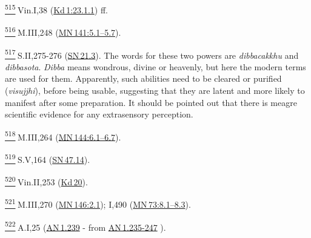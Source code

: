 \label{footprints_split_025.html_fn515}
\hyperref[footprints_split_014.htmlux5cux23fnref515]{\textsuperscript{515}} Vin.I,38
(\href{https://suttacentral.net/pli-tv-kd1/en/brahmali\#23.1.1}{Kd\,1:23.1.1})
ff.

\label{footprints_split_025.html_fn516}
\hyperref[footprints_split_014.htmlux5cux23fnref516]{\textsuperscript{516}} M.III,248
(\href{https://suttacentral.net/mn141/en/sujato\#5.1}{MN\,141:5.1--5.7}).

\label{footprints_split_025.html_fn517}
\hyperref[footprints_split_014.htmlux5cux23fnref517]{\textsuperscript{517}} S.II,275-276
(\href{https://suttacentral.net/sn21.3/en/sujato}{SN\,21.3}). The words
for these two powers are \emph{dibbacakkhu} and \emph{dibbasota}.
\emph{Dibba} means wondrous, divine or heavenly, but here the modern
terms are used for them. Apparently, such abilities need to be cleared
or purified (\emph{visujjhi}), before being usable, suggesting that they
are latent and more likely to manifest after some preparation. It should
be pointed out that there is meagre scientific evidence for any
extrasensory perception.

\label{footprints_split_025.html_fn518}
\hyperref[footprints_split_014.htmlux5cux23fnref518]{\textsuperscript{518}} M.III,264
(\href{https://suttacentral.net/mn144/en/sujato\#6.1}{MN\,144:6.1--6.7}).

\label{footprints_split_025.html_fn519}
\hyperref[footprints_split_014.htmlux5cux23fnref519]{\textsuperscript{519}} S.V,164
(\href{https://suttacentral.net/sn47.14/en/sujato}{SN\,47.14}).

\label{footprints_split_025.html_fn520}
\hyperref[footprints_split_014.htmlux5cux23fnref520]{\textsuperscript{520}} Vin.II,253
(\href{https://suttacentral.net/pli-tv-kd20/en/brahmali}{Kd\,20}).

\label{footprints_split_025.html_fn521}
\hyperref[footprints_split_014.htmlux5cux23fnref521]{\textsuperscript{521}} M.III,270
(\href{https://suttacentral.net/mn146/en/sujato\#2.1}{MN\,146:2.1});
I,490
(\href{https://suttacentral.net/mn73/en/sujato\#8.1}{MN\,73:8.1--8.3}).

\label{footprints_split_025.html_fn522}
\hyperref[footprints_split_014.htmlux5cux23fnref522]{\textsuperscript{522}} A.I,25
(\href{https://suttacentral.net/an1.239/en/sujato}{AN\,1.239} - from
\href{https://suttacentral.net/an1.235-247/en/sujato}{AN\,1.235-247} ).


